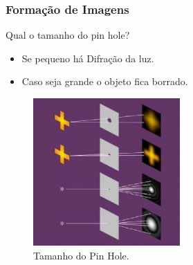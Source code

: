 \documentclass{beamer}
\begin{document}

\begin{frame}
\frametitle{Formação de Imagens}

	\begin{block}{Qual o tamanho do pin hole?}
		\begin{itemize}
			\item Se pequeno há Difração da luz.
			\item Caso seja grande o objeto fica borrado.
		\end{itemize}
	\end{block}
	
	\begin{figure}[htb!]
  		\centering
      		\includegraphics[width=0.5\textwidth]{Figures/pinHole}
      		\caption{Tamanho do Pin Hole.}
  		\label{iep}
	\end{figure}

\end{frame}
\end{document}
